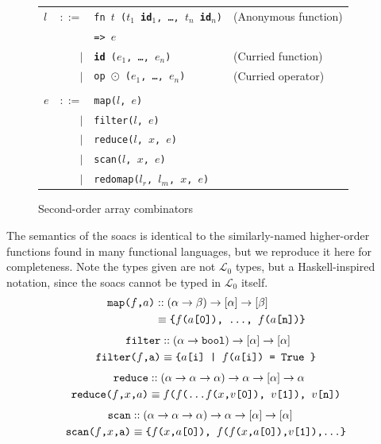 \documentclass{sigplanconf}  %
\newcommand{\LO}{$\mathcal{L}_0$}
\begin{document}
\begin{figure}[bt]
\begin{tabular}{lrll}
$l$ & $::=$ & {\tt fn $t$ ($t_{1}$ {\bf id}$_{1}$, \ldots, $t_{n}$ {\bf id}$_{n}$)} & (Anonymous function) \\
&     & {\tt => $e$} \\
& $|$ & {\tt {\bf id} ($e_{1}$, \ldots, $e_{n}$)} & (Curried function) \\
& $|$ & {\tt op $\odot$ ($e_{1}$, \ldots, $e_{n}$)} & (Curried operator) \\
\\
$e$ & $::=$ & {\tt map($l$, $e$)} \\
    & $|$ & {\tt filter($l$, $e$)} \\
    & $|$ & {\tt reduce($l$, $x$, $e$)} \\
    & $|$ & {\tt scan($l$, $x$, $e$)} \\
    & $|$ & {\tt redomap($l_{r}$, $l_{m}$, $x$, $e$)} \\
\end{tabular}
\caption{Second-order array combinators}
\label{fig:soacs}
\end{figure}

The semantics of the {\sc soac}s is identical to the similarly-named
higher-order functions found in many functional languages, but we
reproduce it here for completeness.  Note the types given are not \LO{}
types, but a Haskell-inspired notation, since the {\sc soac}s cannot be 
typed in \LO{} itself.
\begin{align*}
\text{\tt map($f$,$a$)}
& :: (\alpha\rightarrow\beta)\rightarrow[\alpha]\rightarrow[\beta] \\
& \equiv \text{\tt\{$f$($a$[0]), \ldots, $f$($a$[n])\}}
\end{align*}
\begin{align*}
\text{\tt filter}
& :: (\alpha\rightarrow{\tt bool})\rightarrow[\alpha]\rightarrow[\alpha] \\
\text{\tt filter($f$,a)} & \equiv \text{\tt\{$a$[i] | $f$($a$[i]) = {\tt True }\}}
\end{align*}
\begin{align*}
\text{\tt reduce}
& :: (\alpha\rightarrow\alpha\rightarrow\alpha)\rightarrow\alpha\rightarrow[\alpha]\rightarrow\alpha \\
\text{\tt reduce($f$,$x$,$a$)} & \equiv \text{\tt $f$($f$(\ldots $f$($x$,$v$[0]), $v$[1]), $v$[n])}
\end{align*}
\begin{align*}
\text{\tt scan}
& :: (\alpha\rightarrow\alpha\rightarrow\alpha)\rightarrow\alpha\rightarrow[\alpha]\rightarrow[\alpha] \\
\text{\tt scan($f$,$x$,a)} & \equiv \text{\tt\{$f$($x$,$a$[0]), $f$($f$($x$,$a$[0]),$v$[1]),\ldots\}}
\end{align*}
\end{document}
